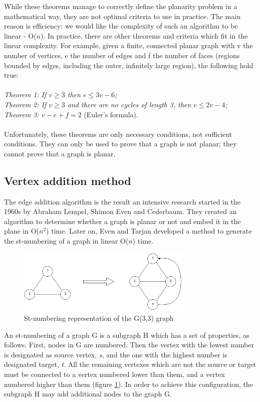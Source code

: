 While these theorems manage to correctly define the planarity problem in a mathematical way, they are not optimal 
criteria to use in practice. The main reason is efficiency: we would like the complexity of such an algorithm 
to be linear - O($n$). In practice, there are other theorems and criteria which fit in the linear complexity. For 
example, given a finite, connected planar graph with v the number of vertices, e the number of edges and 
f the number of faces (regions bounded by edges, including the outer, infinitely large region), the following 
hold true:
\\ 
\\ \textit{Theorem 1: If $v \geq 3$ then $e \leq 3v-6$;}
\\ \textit{Theorem 2: If $v \geq 3$ and there are no cycles of length 3, then $e \leq 2v-4$;}
\\ \textit{Theorem 3: $v - e + f = 2$} (Euler's formula).
\\ 
\\ Unfortunately, these theorems are only necessary conditions, not sufficient conditions. They can only be used to 
prove that a graph is not planar; they cannot prove that a graph is planar.

\subsection{Vertex addition method}

The edge addition algorithm is the result an intensive research started in the 1960s by Abraham Lempel, Shimon Even
and Cederbaum. They created an algorithm to determine whether a graph is planar or not and embed it in the plane in 
O($n^{2}$) time. Later on, Even and Tarjan developed a method to generate the st-numbering of a graph in linear O(${n}$) time.

\begin{figure}[ht] \centering
\includegraphics[width=0.75\textwidth]{img/algdesing/st_numbering.png}
\caption{St-numbering representation of the G(3,3) graph \label{st}} \end{figure}

An st-numbering\cite{even1976computing} of a graph G is a subgraph H which has a set of properties, as follows. First, nodes in G are numbered. 
Then the vertex with the lowest number is designated as source vertex, \emph{s}, and the one with the highest number 
is designated target, \emph{t}. All the remaining vertexes which are not the source or target must be connected to a 
vertex numbered lower than them, and a vertex numbered higher than them (figure \ref{st}). In order to achieve this configuration, the 
subgraph H may add additional nodes to the graph G.

